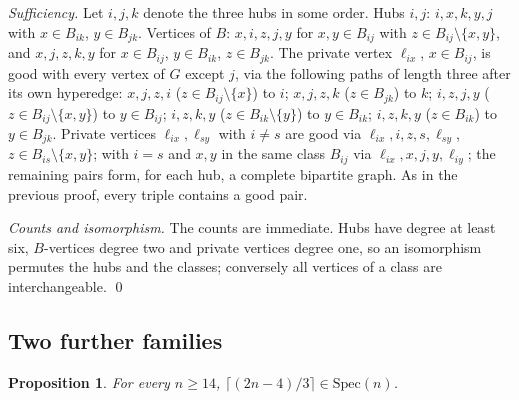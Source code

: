 \documentclass[11pt]{article}
\newtheorem{proposition}[theorem]{Proposition}
\theoremstyle{remark}
\begin{document}
\emph{Sufficiency.} Let $i,j,k$ denote the three hubs in some order. Hubs
$i,j$: $i,x,k,y,j$ with $x\in B_{ik}$, $y\in B_{jk}$. Vertices of $B$:
$x,i,z,j,y$ for $x,y\in B_{ij}$ with $z\in B_{ij}\setminus\{x,y\}$, and
$x,j,z,k,y$ for $x\in B_{ij}$, $y\in B_{ik}$, $z\in B_{jk}$. The private
vertex $\ell_{ix}$, $x\in B_{ij}$, is good with every vertex of $G$ except
$j$, via the following paths of length three after its own hyperedge:
$x,j,z,i$ ($z\in B_{ij}\setminus\{x\}$) to $i$; $x,j,z,k$ ($z\in B_{jk}$)
to $k$; $i,z,j,y$ ($z\in B_{ij}\setminus\{x,y\}$) to $y\in B_{ij}$;
$i,z,k,y$ ($z\in B_{ik}\setminus\{y\}$) to $y\in B_{ik}$; $i,z,k,y$
($z\in B_{ik}$) to $y\in B_{jk}$. Private vertices $\ell_{ix},\ell_{sy}$
with $i\ne s$ are good via $\ell_{ix},i,z,s,\ell_{sy}$,
$z\in B_{is}\setminus\{x,y\}$; with $i=s$ and $x,y$ in the same class
$B_{ij}$ via $\ell_{ix},x,j,y,\ell_{iy}$; the remaining pairs form, for
each hub, a complete bipartite graph. As in the previous proof, every
triple contains a good pair.

\emph{Counts and isomorphism.} The counts are immediate. Hubs have degree
at least six, $B$-vertices degree two and private vertices degree one, so
an isomorphism permutes the hubs and the classes; conversely all vertices
of a class are interchangeable. \qed

\subsection{Two further families}

\begin{proposition}\label{prop:ht}
For every $n\ge14$, $\lceil(2n-4)/3\rceil\in\mathrm{Spec}(n)$.
\end{proposition}
\end{document}
